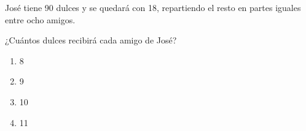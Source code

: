 \begin{problem}
    José tiene 90 dulces y se quedará con 18, repartiendo el resto en partes iguales entre ocho amigos.

    ¿Cuántos dulces recibirá cada amigo de José?

    \begin{enumerate}[label=\Alph*.]
        \item 8
        \item 9
        \item 10
        \item 11
    \end{enumerate}
\end{problem}
